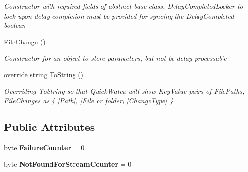 \begin{DoxyCompactItemize}
\begin{DoxyCompactList}\small\item\em Constructor with required fields of abstract base class, Delay\-Completed\-Locker to lock upon delay completion must be provided for syncing the Delay\-Completed boolean \end{DoxyCompactList}\item 
\hyperlink{class_cloud_api_public_1_1_model_1_1_file_change_adc8f11183263555d2facbf4354106797}{File\-Change} ()
\begin{DoxyCompactList}\small\item\em Constructor for an object to store parameters, but not be delay-\/processable \end{DoxyCompactList}\item 
override string \hyperlink{class_cloud_api_public_1_1_model_1_1_file_change_abf7bd8fb9c0b7bfcada1aa39a568a13b}{To\-String} ()
\begin{DoxyCompactList}\small\item\em Overriding To\-String so that Quick\-Watch will show Key\-Value pairs of File\-Paths, File\-Changes as \{ \mbox{[}Path\mbox{]}, \mbox{[}File or folder\mbox{]} \mbox{[}Change\-Type\mbox{]} \} \end{DoxyCompactList}\end{DoxyCompactItemize}
\subsection*{Public Attributes}
\begin{DoxyCompactItemize}
\item 
\hypertarget{class_cloud_api_public_1_1_model_1_1_file_change_a731705220f8c9b1ceb3022bae1bbe02e}{byte {\bfseries Failure\-Counter} = 0}\label{class_cloud_api_public_1_1_model_1_1_file_change_a731705220f8c9b1ceb3022bae1bbe02e}

\item 
\hypertarget{class_cloud_api_public_1_1_model_1_1_file_change_a7cd99f56c8ec93e35a9dbdcce37d673a}{byte {\bfseries Not\-Found\-For\-Stream\-Counter} = 0}\label{class_cloud_api_public_1_1_model_1_1_file_change_a7cd99f56c8ec93e35a9dbdcce37d673a}

\end{DoxyCompactItemize}
